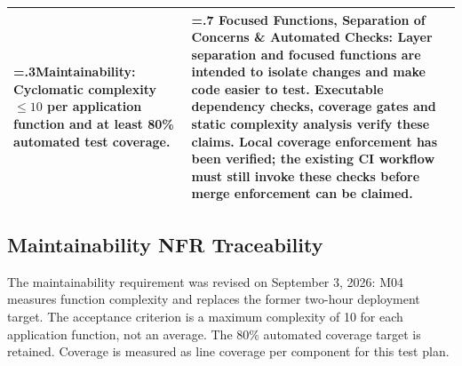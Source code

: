 \documentclass[12pt, a4paper]{article}
\begin{document}
\begin{table}[h!]
\begin{tabularx}{\textwidth}{|>{\hsize=.3\hsize}X|>{\hsize=.7\hsize}X|}
\textbf{Maintainability:} Cyclomatic complexity $\leq 10$ per application function and at least 80\% automated test coverage. & \textbf{Focused Functions, Separation of Concerns \& Automated Checks:} Layer separation and focused functions are intended to isolate changes and make code easier to test. Executable dependency checks, coverage gates and static complexity analysis verify these claims. Local coverage enforcement has been verified; the existing CI workflow must still invoke these checks before merge enforcement can be claimed. \\ \hline
\end{tabularx}
\end{table}


\newpage
\subsection{Maintainability NFR Traceability}
The maintainability requirement was revised on September 3, 2026: M04 measures
function complexity and replaces the former two-hour deployment target.
The acceptance criterion is a maximum complexity of 10 for each application
function, not an average. The 80\% automated coverage target is retained.
Coverage is measured as line coverage per component for this test plan.
\end{document}

